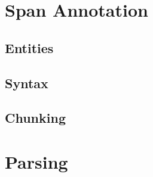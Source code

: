 \documentclass[a4paper,12pt]{article}
\begin{document}
\section{Span Annotation}

\subsection{Entities}

\subsection{Syntax}

\subsection{Chunking}





\section{Parsing}
\end{document}
